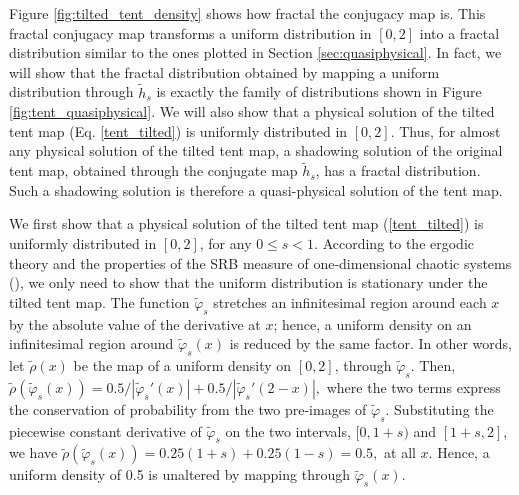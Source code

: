 Figure \ref{fig:tilted_tent_density} shows how fractal the conjugacy map is.
This fractal conjugacy map transforms a uniform distribution in $[0,2]$ into
a fractal distribution similar to the ones plotted in Section \ref{sec:quasiphysical}.
In fact, we will show that the fractal distribution obtained by mapping a uniform
distribution through $\tilde{h}_s$ is exactly the family of distributions
shown in Figure \ref{fig:tent_quasiphysical}.  We will also show that
a physical solution of the tilted tent map (Eq. \ref{tent_tilted}) is uniformly
distributed in $[0,2]$.  Thus, for almost any physical solution of the
tilted tent map, a shadowing solution of the original tent map, obtained
through the conjugate map $\tilde{h}_s$, has a fractal distribution.
Such a shadowing solution is therefore a quasi-physical solution of
the tent map.

We first show that a physical solution of the tilted tent map 
(\ref{tent_tilted}) is uniformly distributed in $[0,2]$, for
any $0\le s<1$.
According to the ergodic theory and the properties of the SRB measure of 
one-dimensional chaotic systems (\cite{young}), 
we only need to show that the uniform
distribution is stationary under the tilted tent map.
The function $\tilde{\varphi}_s$ stretches an infinitesimal
region around each $x$ by the absolute value of the derivative at $x$; 
hence, a uniform density on an infinitesimal region around $\tilde{\varphi}_s(x)$ 
is reduced by the same factor. In other words, let $\tilde{\rho}(x)$ 
be the map of a uniform density on $[0,2]$, through $\tilde{\varphi}_s$. Then, 
$\tilde{\rho}(\tilde{\varphi}_s (x)) = 0.5/|\tilde \varphi_s'(x)| + 0.5/|\tilde \varphi_s'(2-x)|,$ where the two terms express the conservation of probability 
from the two pre-images of $\tilde{\varphi}_s$. Substituting the piecewise constant 
derivative of $\tilde{\varphi}_s$ on the two intervals, $[0,1+s)$ and $[1+s,2]$,
we have $\tilde{\rho}(\tilde{\varphi}_s (x)) = 0.25(1+s) + 0.25(1-s) = 0.5,$ at 
all $x.$ Hence, a uniform density of 0.5 is unaltered by mapping through 
$\tilde\varphi_s(x)$.

